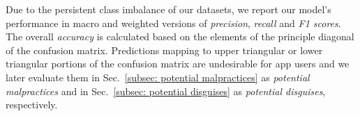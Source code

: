 Due to the persistent class imbalance of our datasets, we report our model's performance in macro and weighted versions of \emph{precision}, \emph{recall} and \emph{F1 scores}. The overall \emph{accuracy} is calculated based on the elements of the principle diagonal of the confusion matrix. Predictions mapping to upper triangular or lower triangular portions of the confusion matrix are undesirable for app users and we later evaluate them in Sec.~\ref{subsec: potential malpractices} as \emph{potential malpractices} and in Sec.~\ref{subsec: potential disguises} as \emph{potential disguises}, respectively. 




